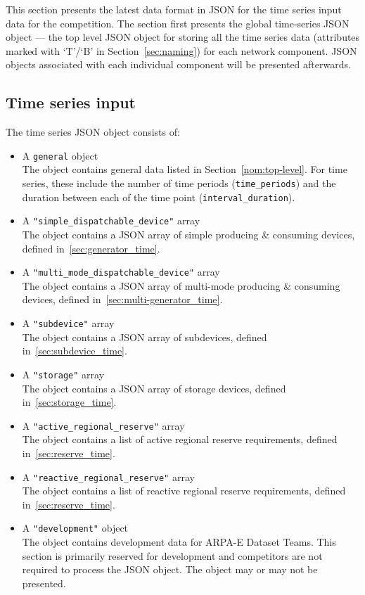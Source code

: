 \label{sec:time_series}
This section presents the latest data format in JSON for the
time series input data for the competition.
The section first presents the global time-series JSON object --- the
top level JSON object for storing all the time series data
(attributes marked with `T'/`B' in Section~\ref{sec:naming})
for each network component.
JSON objects associated with each individual component will be presented afterwards.


\subsection{Time series input}
\label{sec:input_data}
The time series JSON object consists of:
\begin{itemize}
    \item A \texttt{general} object\\
    The object contains general data listed
    in Section~\ref{nom:top-level}.
    For time series, these include the number of time periods (\texttt{time\_periods}) and the duration
    between each of the time point (\texttt{interval\_duration}).
    \item A \texttt{"simple\_dispatchable\_device"} array\\
    The object contains a JSON array of simple producing \& consuming devices, defined in~\ref{sec:generator_time}.
    \item A \texttt{"multi\_mode\_dispatchable\_device"} array \\
    The object contains a JSON array of multi-mode producing \& consuming devices, defined in~\ref{sec:multi-generator_time}.
    \item A \texttt{"subdevice"} array\\
    The object contains a JSON array of subdevices, defined in~\ref{sec:subdevice_time}.
    \item A \texttt{"storage"} array\\
    The object contains a JSON array of storage devices, defined in~\ref{sec:storage_time}.
    \item A \texttt{"active\_regional\_reserve"} array\\
    The object contains a list of active regional reserve requirements, defined in~\ref{sec:reserve_time}.
    \item A \texttt{"reactive\_regional\_reserve"} array\\
    The object contains a list of reactive regional reserve requirements, defined in~\ref{sec:reserve_time}.
    \item A \texttt{"development"} object\\
    The object contains development data for ARPA-E Dataset Teams. This section is primarily reserved for development and competitors are not required to process the JSON object. The object may or may not be presented.
\end{itemize}

